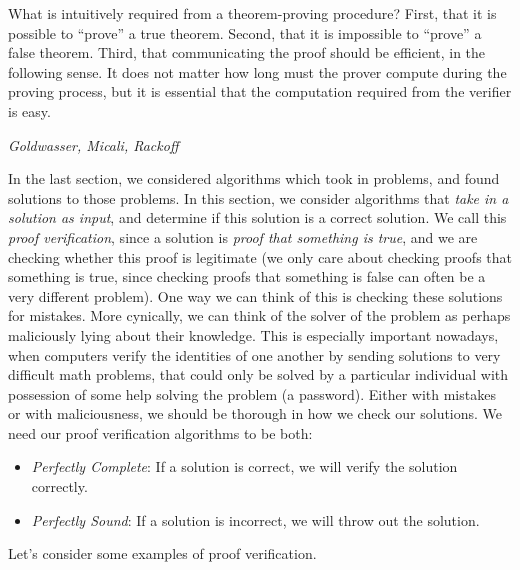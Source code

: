 \documentclass[answers]{exam}
\begin{document}
\epigraph{What is intuitively required from a theorem-proving procedure?
First, that it is possible to “prove” a true theorem. Second, that
it is impossible to “prove” a false theorem. Third, that communicating the proof should be efficient, in the following sense. It
does not matter how long must the prover compute during the
proving process, but it is essential that the computation required
from the verifier is easy.}{\textit{Goldwasser, Micali, Rackoff}}

In the last section, we considered algorithms which took in problems, and found solutions to those problems. In this section, we consider algorithms that \emph{take in a solution as input}, and determine if this solution is a correct solution. We call this \emph{proof verification}, since a solution is \emph{proof that something is true}, and we are checking whether this proof is legitimate (we only care about checking proofs that something is true, since checking proofs that something is false can often be a very different problem). One way we can think of this is checking these solutions for mistakes. More cynically, we can think of the solver of the problem as perhaps maliciously lying about their knowledge. This is especially important nowadays, when computers verify the identities of one another by sending solutions to very difficult math problems, that could only be solved by a particular individual with possession of some help solving the problem (a password). Either with mistakes or with maliciousness, we should be thorough in how we check our solutions. We need our proof verification algorithms to be both:
%
\begin{itemize}
    \item \emph{Perfectly Complete}: If a solution is correct, we will verify the solution correctly.

    \item \emph{Perfectly Sound}: If a solution is incorrect, we will throw out the solution.
\end{itemize}
%
Let's consider some examples of proof verification.
\end{document}
